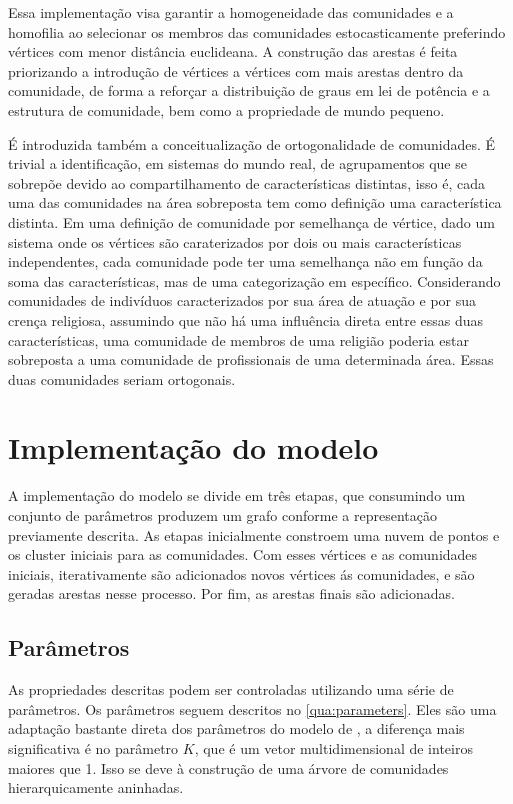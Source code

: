 \documentclass[notes.tex]{subfiles}
\begin{document}
Essa implementação visa garantir a homogeneidade das comunidades e a homofilia ao selecionar os membros das comunidades estocasticamente preferindo vértices com menor distância euclideana.
A construção das arestas é feita priorizando a introdução de vértices a vértices com mais arestas dentro da comunidade, de forma a reforçar a distribuição de graus em lei de potência e a estrutura de comunidade, bem como a propriedade de mundo pequeno.

É introduzida também a conceitualização de ortogonalidade de comunidades.
É trivial a identificação, em sistemas do mundo real, de agrupamentos que se sobrepõe devido ao compartilhamento de características distintas, isso é, cada uma das comunidades na área sobreposta tem como definição uma característica distinta.
Em uma definição de comunidade por semelhança de vértice, dado um sistema onde os vértices são caraterizados por dois ou mais características independentes, cada comunidade pode ter uma semelhança não em função da soma das características, mas de uma categorização em específico.
Considerando comunidades de indivíduos caracterizados por sua área de atuação e por sua crença religiosa, assumindo que não há uma influência direta entre essas duas características, uma comunidade de membros de uma religião poderia estar sobreposta a uma comunidade de profissionais de uma determinada área.
Essas duas comunidades seriam ortogonais.

\section{Implementação do modelo}

A implementação do modelo se divide em três etapas, que consumindo um conjunto de parâmetros produzem um grafo conforme a representação previamente descrita.
As etapas inicialmente constroem uma nuvem de pontos e os cluster iniciais para as comunidades.
Com esses vértices e as comunidades iniciais, iterativamente são adicionados novos vértices ás comunidades, e são geradas arestas nesse processo.
Por fim, as arestas finais são adicionadas.

\subsection{Parâmetros}

As propriedades descritas podem ser controladas utilizando uma série de parâmetros.
Os parâmetros seguem descritos no \autoref{qua:parameters}.
Eles são uma adaptação bastante direta dos parâmetros do modelo de , a diferença mais significativa é no parâmetro $K$, que é um vetor multidimensional de inteiros maiores que 1.
Isso se deve à construção de uma árvore de comunidades hierarquicamente aninhadas.
\end{document}
